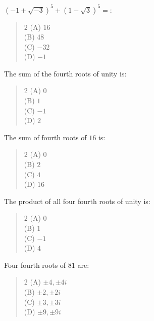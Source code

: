 \documentclass[11pt,a4paper]{article}
\begin{document}
\begin{mcqlist}
\item $(-1+\sqrt{-3})^5+(1-\sqrt3)^5=$:
\begin{quote}\begin{multicols}{2}
\noindent (A) $16$ \\
(B) $48$ \\
(C) $-32$ \\
(D) $-1$
\end{multicols}\end{quote}

\item The sum of the fourth roots of unity is:
\begin{quote}\begin{multicols}{2}
\noindent (A) $0$ \\
(B) $1$ \\
(C) $-1$ \\
(D) $2$
\end{multicols}\end{quote}

\item The sum of fourth roots of $16$ is:
\begin{quote}\begin{multicols}{2}
\noindent (A) $0$ \\
(B) $2$ \\
(C) $4$ \\
(D) $16$
\end{multicols}\end{quote}

\item The product of all four fourth roots of unity is:
\begin{quote}\begin{multicols}{2}
\noindent (A) $0$ \\
(B) $1$ \\
(C) $-1$ \\
(D) $4$
\end{multicols}\end{quote}

\item Four fourth roots of $81$ are:
\begin{quote}\begin{multicols}{2}
\noindent (A) $\pm4,\pm4i$ \\
(B) $\pm2,\pm2i$ \\
(C) $\pm3,\pm3i$ \\
(D) $\pm9,\pm9i$
\end{multicols}\end{quote}


\end{mcqlist}
\end{document}
